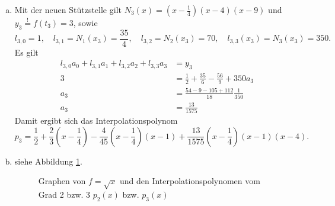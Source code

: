 \documentclass{article}
\theoremstyle{definition}
\begin{document}
\begin{enumerate}[(a)]
\begin{align*}
\begin{gmatrix}[p]
            1 & 0 & 0 & \frac{1}{2}\\
            0 & \frac{3}{4} & 0 & \frac{1}{2}\\
            0 & \frac{15}{4} & \frac{45}{4} & \frac{3}{2}
            \rowops
            \add[-5]{1}{2}
            \mult{1}{\frac{4}{3}}
        \end{gmatrix}\leadsto
        \begin{gmatrix}[p]
            1 & 0 & 0 & \frac{1}{2}\\
            0 & 1 & 0 & \frac{2}{3}\\
            0 & 0& \frac{45}{4} & -1
        \end{gmatrix}
    \end{align*}
    so erhalten wir \[a = \begin{pmatrix}
        \frac{1}{2}\\\frac{2}{3}\\-\frac{4}{45}
    \end{pmatrix}.\]
    Als Interpolationspolynom erhalten wir demnach \[p_2(x) = \frac{1}{2} + \frac{2}{3}(x-\frac{1}{4}) -\frac{4}{45}(x-\frac{1}{4})(x-1).\]
    \item Mit der neuen Stützstelle gilt $N_3(x) = (x-\frac{1}{4})(x-4)(x-9)$ und $y_3 \overset{!}{=} f(t_3) = 3$, sowie \[l_{3,0} = 1,\quad l_{3,1} = N_1(x_3) = \frac{35}{4},\quad l_{3,2} = N_2(x_3) = 70,\quad l_{3,3}(x_3) = N_3(x_3) = 350.\] Es gilt
    \begin{align*}
        l_{3,0}a_0 + l_{3,1}a_1 + l_{3,2}a_2 + l_{3,3}a_3 &= y_3\\
        3 &= \frac{1}{2} + \frac{35}{6} -\frac{56}{9} + 350 a_3\\
        a_3 &= \frac{54 - 9 - 105 + 112}{18} \frac{1}{350}\\
        a_3 &= \frac{13}{1575}
    \end{align*}
    Damit ergibt sich das Interpolationspolynom \[p_3 = \frac{1}{2} + \frac{2}{3}(x-\frac{1}{4}) -\frac{4}{45}(x-\frac{1}{4})(x-1) + \frac{13}{1575}(x-\frac{1}{4})(x-1)(x-4).\]
    \item siehe Abbildung \ref{fig:1c}. 
    \begin{figure}
        \centering
        \caption{Graphen von $f = \sqrt{x}$ und den Interpolationspolynomen vom Grad 2 bzw. 3 $p_2(x)$ bzw. $p_3(x)$}
        \label{fig:1c}
    \end{figure}
\end{enumerate}
\end{document}
